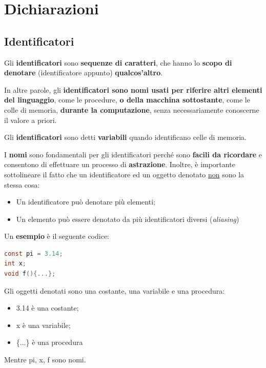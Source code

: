 \documentclass[a4paper]{article}
\begin{document}
	\section{Dichiarazioni}
	
	\subsection{Identificatori}
	
	Gli \textbf{identificatori} sono \textbf{sequenze di caratteri}, che hanno lo \textbf{scopo di denotare} (identificatore appunto) \textbf{qualcos'altro}.\newline
	
	\noindent
	In altre parole, gli \textbf{identificatori sono nomi usati per riferire altri elementi del linguaggio}, come le procedure, \textbf{o della macchina sottostante}, come le colle di memoria, \textbf{durante la computazione}, senza necessariamente conoscerne il valore a priori.\newline
	
	\noindent
	Gli \textbf{identificatori} sono detti \textbf{variabili} quando identificano celle di memoria.\newline
	
	\noindent
	I \textbf{nomi} sono fondamentali per gli identificatori perché sono \textbf{facili da ricordare} e consentono di effettuare un processo di \textbf{astrazione}. Inoltre, è importante sottolineare il fatto che un identificatore ed un oggetto denotato \underline{non} sono la stessa cosa:
	\begin{itemize}
		\item Un identificatore può denotare più elementi;
		\item Un elemento può essere denotato da più identificatori diversi (\emph{aliasing})
	\end{itemize}
	Un \textcolor{Green4}{\textbf{esempio}} è il seguente codice:
	\begin{lstlisting}[language=C]
const pi = 3.14;
int x;
void f(){...};\end{lstlisting}
	Gli oggetti denotati sono una costante, una variabile e una procedura:
	\begin{itemize}
		\item \textsf{3.14} è una costante;
		\item \textsf{x} è una variabile;
		\item \textsf{\{...\}} è una procedura
	\end{itemize}
	Mentre \textsf{pi, x, f} sono nomi.\newline
	
\end{document}
